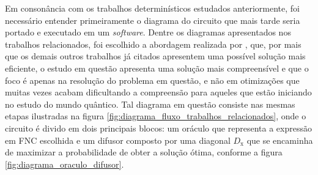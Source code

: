 \documentclass[12pt]{article}
\begin{document}
Em consonância com os trabalhos determinísticos estudados anteriormente, foi necessário entender primeiramente o diagrama do circuito que mais tarde seria portado e executado em um \textit{software}. Dentre os diagramas apresentados nos trabalhos relacionados, foi escolhido a abordagem realizada por \cite{fernandes:19}, que, por mais que os demais outros trabalhos já citados apresentem uma possível solução mais eficiente, o estudo em questão apresenta uma solução mais compreensível e que o foco é apenas na resolução do problema em questão, e não em otimizações que muitas vezes acabam dificultando a compreensão para aqueles que estão iniciando no estudo do mundo quântico. Tal diagrama em questão consiste nas mesmas etapas ilustradas na figura \ref{fig:diagrama_fluxo_trabalhos_relacionados}, onde o circuito é divido em dois principais blocos: um oráculo que representa a expressão em FNC escolhida e um difusor composto por uma diagonal $\mathrm{\textit{D}_x}$ que se encaminha de maximizar a probabilidade de obter a solução ótima, conforme a figura \ref{fig:diagrama_oraculo_difusor}.
\end{document}
